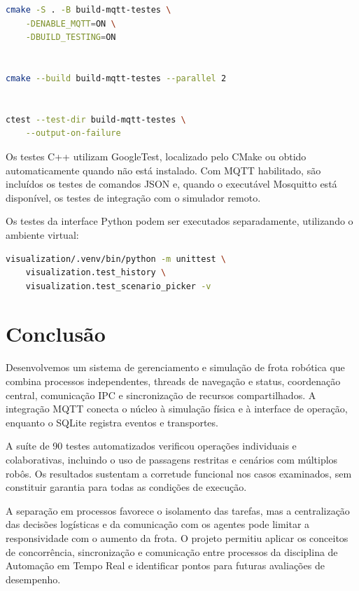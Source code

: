 \documentclass[12pt,a4paper]{article}
\begin{document}
\begin{lstlisting}[basicstyle=\ttfamily\footnotesize, language=bash]
cmake -S . -B build-mqtt-testes \
    -DENABLE_MQTT=ON \
    -DBUILD_TESTING=ON


cmake --build build-mqtt-testes --parallel 2


ctest --test-dir build-mqtt-testes \
    --output-on-failure
\end{lstlisting}

Os testes C++ utilizam GoogleTest, localizado pelo CMake ou obtido
automaticamente quando não está instalado. Com MQTT habilitado, são incluídos
os testes de comandos JSON e, quando o executável Mosquitto está disponível, os
testes de integração com o simulador remoto.

Os testes da interface Python podem ser executados separadamente, utilizando o
ambiente virtual:

\begin{lstlisting}[basicstyle=\ttfamily\footnotesize, language=bash]
visualization/.venv/bin/python -m unittest \
    visualization.test_history \
    visualization.test_scenario_picker -v
\end{lstlisting}

\section{Conclusão}

Desenvolvemos um sistema de gerenciamento e simulação de frota robótica que
combina processos independentes, threads de navegação e status, coordenação
central, comunicação IPC e sincronização de recursos compartilhados. A
integração MQTT conecta o núcleo à simulação física e à interface de operação,
enquanto o SQLite registra eventos e transportes.

A suíte de 90 testes automatizados verificou operações individuais e
colaborativas, incluindo o uso de passagens restritas e cenários com múltiplos
robôs. Os resultados sustentam a corretude funcional nos casos examinados, sem
constituir garantia para todas as condições de execução.

A separação em processos favorece o isolamento das tarefas, mas a centralização
das decisões logísticas e da comunicação com os agentes pode limitar a
responsividade com o aumento da frota. O projeto permitiu aplicar os conceitos
de concorrência, sincronização e comunicação entre processos da disciplina de
Automação em Tempo Real e identificar pontos para futuras avaliações de
desempenho.
\end{document}
